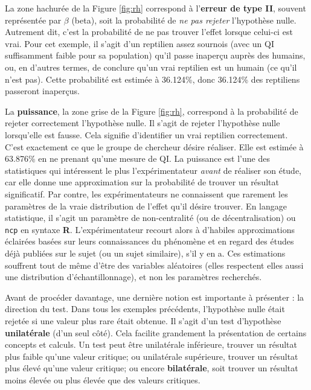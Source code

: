 \documentclass[
]{book}
\begin{document}
La zone hachurée de la Figure \ref{fig:rh} correspond à l'\textbf{erreur de type II}, souvent représentée par \(\beta\) (beta), soit la probabilité de \emph{ne pas rejeter} l'hypothèse nulle. Autrement dit, c'est la probabilité de ne pas trouver l'effet lorsque celui-ci est vrai. Pour cet exemple, il s'agit d'un reptilien assez sournois (avec un QI suffisamment faible pour sa population) qu'il passe inaperçu auprès des humains, ou, en d'autres termes, de conclure qu'un vrai reptilien est un humain (ce qu'il n'est pas). Cette probabilité est estimée à 36.124\%, donc 36.124\% des reptiliens passeront inaperçus.

La \textbf{puissance}, la zone grise de la Figure \ref{fig:rh}, correspond à la probabilité de rejeter correctement l'hypothèse nulle. Il s'agit de rejeter l'hypothèse nulle lorsqu'elle est fausse. Cela signifie d'identifier un vrai reptilien correctement. C'est exactement ce que le groupe de chercheur désire réaliser. Elle est estimée à 63.876\% en ne prenant qu'une mesure de QI. La puissance est l'une des statistiques qui intéressent le plus l'expérimentateur \emph{avant} de réaliser son étude, car elle donne une approximation sur la probabilité de trouver un résultat significatif. Par contre, les expérimentateurs ne connaissent que rarement les paramètres de la vraie distribution de l'effet qu'il désire trouver. En langage statistique, il s'agit un paramètre de non-centralité (ou de décentralisation) ou \texttt{ncp} en syntaxe \textbf{R}. L'expérimentateur recourt alors à d'habiles approximations éclairées basées sur leurs connaissances du phénomène et en regard des études déjà publiées sur le sujet (ou un sujet similaire), s'il y en a. Ces estimations souffrent tout de même d'être des variables aléatoires (elles respectent elles aussi une distribution d'échantillonnage), et non les paramètres recherchés.

Avant de procéder davantage, une dernière notion est importante à présenter : la direction du test. Dans tous les exemples précédents, l'hypothèse nulle était rejetée si une valeur plus rare était obtenue. Il s'agit d'un test d'hypothèse \textbf{unilatérale} (d'un seul côté). Cela facilite grandement la présentation de certains concepts et calculs. Un test peut être unilatérale inférieure, trouver un résultat plus faible qu'une valeur critique; ou unilatérale supérieure, trouver un résultat plus élevé qu'une valeur critique; ou encore \textbf{bilatérale}, soit trouver un résultat moins élevée ou plus élevée que des valeurs critiques.
\end{document}

